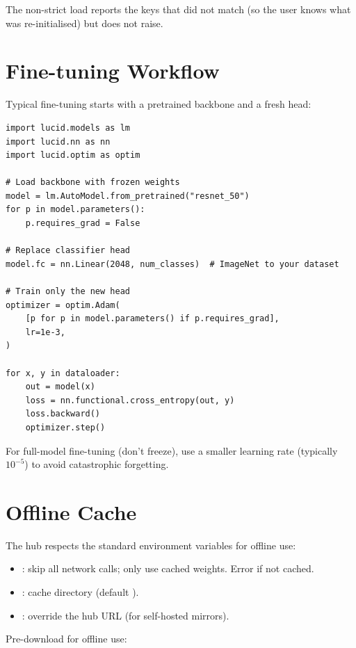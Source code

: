 The non-strict load reports the keys that did not match (so the
user knows what was re-initialised) but does not raise.

\section{Fine-tuning Workflow}
\label{sec:pretrained:finetune_workflow}

Typical fine-tuning starts with a pretrained backbone and a
fresh head:

\begin{lstlisting}[style=lucid,language=LucidPython]
import lucid.models as lm
import lucid.nn as nn
import lucid.optim as optim

# Load backbone with frozen weights
model = lm.AutoModel.from_pretrained("resnet_50")
for p in model.parameters():
    p.requires_grad = False

# Replace classifier head
model.fc = nn.Linear(2048, num_classes)  # ImageNet to your dataset

# Train only the new head
optimizer = optim.Adam(
    [p for p in model.parameters() if p.requires_grad],
    lr=1e-3,
)

for x, y in dataloader:
    out = model(x)
    loss = nn.functional.cross_entropy(out, y)
    loss.backward()
    optimizer.step()
\end{lstlisting}

For full-model fine-tuning (don't freeze), use a smaller
learning rate (typically $10^{-5}$) to avoid catastrophic
forgetting.

\section{Offline Cache}
\label{sec:pretrained:offline_cache}

The hub respects the standard environment variables for offline
use:

\begin{itemize}
  \item {}: skip all network calls; only
    use cached weights. Error if not cached.
  \item {}: cache directory (default
    ).
  \item {}: override the hub URL (for
    self-hosted mirrors).
\end{itemize}

Pre-download for offline use:

